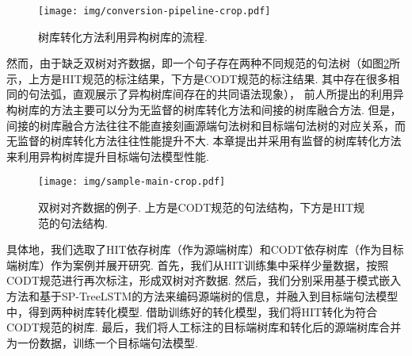 \begin{figure}[hb]
    \centering
    \texttt{[image: img/conversion-pipeline-crop.pdf]}
    \caption{树库转化方法利用异构树库的流程. }
    \label{fig:conversion_pipeline}
\end{figure}

然而，由于缺乏双树对齐数据，即一个句子存在两种不同规范的句法树（如图\ref{fig:example-su-vs-hit-cdt}所示，上方是HIT规范的标注结果，下方是CODT规范的标注结果. 其中存在很多相同的句法弧，直观展示了异构树库间存在的共同语法现象），
前人所提出的利用异构树库的方法主要可以分为无监督的树库转化方法和间接的树库融合方法.
但是，间接的树库融合方法往往不能直接刻画源端句法树和目标端句法树的对应关系，而无监督的树库转化方法往往性能提升不大.
本章提出并采用有监督的树库转化方法来利用异构树库提升目标端句法模型性能.

\begin{figure}[hb]
    \centering
    \texttt{[image: img/sample-main-crop.pdf]}
    \caption{双树对齐数据的例子. 上方是CODT规范的句法结构，下方是HIT规范的句法结构. }
    \label{fig:example-su-vs-hit-cdt}
\end{figure}


具体地，我们选取了HIT依存树库（作为源端树库）和CODT依存树库（作为目标端树库）作为案例并展开研究.
首先，我们从HIT训练集中采样少量数据，按照CODT规范进行再次标注，形成双树对齐数据.
然后，我们分别采用基于模式嵌入方法和基于SP-TreeLSTM的方法来编码源端树的信息，并融入到目标端句法模型中，得到两种树库转化模型.
借助训练好的转化模型，我们将HIT转化为符合CODT规范的树库.
最后，我们将人工标注的目标端树库和转化后的源端树库合并为一份数据，训练一个目标端句法模型.

